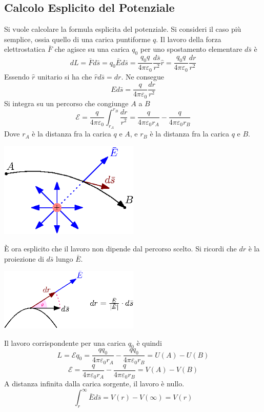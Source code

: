 \documentclass[10pt, letterpaper]{report}
\begin{document}
\subsection{Calcolo Esplicito del Potenziale}
Si vuole calcolare la formula esplicita del potenziale. Si consideri il caso più semplice, ossia quello di una carica puntiforme $q$. Il lavoro della forza elettrostatica $\bar F$ che agisce su una carica $q_0$ per uno spostamento elementare $d\bar s$ è 
$$ dL = \bar F d\bar s =q_0\bar Ed\bar s= 
\frac{q_0q}{4\pi\varepsilon_0}\frac{d\bar s}{r^2}\hat r=
\frac{q_0q}{4\pi\varepsilon_0}\frac{dr}{r^2}$$
Essendo $\hat r$ unitario si ha che $\hat r d\bar s=dr$. Ne consegue 
$$ Ed\bar s=\frac{q}{4\pi\varepsilon_0}\frac{dr}{r^2}$$
Si integra su un percorso che congiunge $A$ a $B$
$$ \mathscr{E}=\frac{q}{4\pi\varepsilon_0}\int_{r_A}^{r_B}\frac{dr}{r^2}=\frac{q}{4\pi\varepsilon_0r_A}-\frac{q}{4\pi\varepsilon_0r_B}$$
Dove $r_A$ è la distanza fra la carica $q$ e $A$, e $r_B$ è la distanza fra la carica $q$ e $B$. \begin{center}
    \includegraphics[width=0.5\textwidth]{images/lavoroCampoEl.eps}
\end{center}
È ora esplicito che il lavoro non dipende dal percorso scelto. Si ricordi che $dr$ è la proiezione di $d\bar s$ lungo $\bar E$. \begin{center}
    \includegraphics[width=0.5\textwidth]{images/dr.eps}
\end{center}
Il lavoro corrispondente per una carica $q_0$ è quindi 
$$ L=\mathscr{E}q_0=\frac{qq_0}{4\pi\varepsilon_0r_A}-\frac{qq_0}{4\pi\varepsilon_0r_B}=U(A)-U(B)$$
$$ \mathscr{E}=\frac{q}{4\pi\varepsilon_0r_A}-\frac{q}{4\pi\varepsilon_0r_B}=V(A)-V(B)$$
A distanza infinita dalla carica sorgente, il lavoro è nullo. 
$$ \int_r^\infty \bar E   d\bar s= V(r)-V(\infty)=V(r)$$
\end{document}
